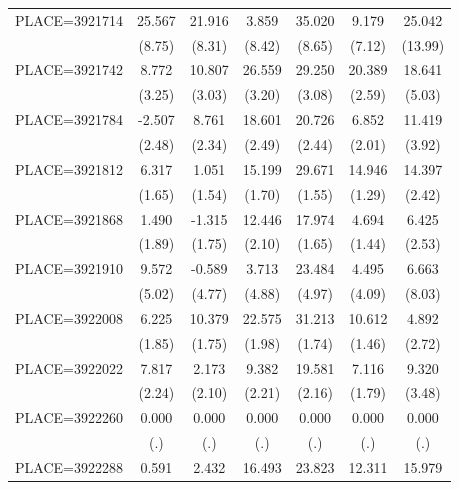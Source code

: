 {\begin{tabular}{l*{6}{c}}
PLACE=3921714       &      25.567&      21.916&       3.859&      35.020&       9.179&      25.042\\
                    &      (8.75)&      (8.31)&      (8.42)&      (8.65)&      (7.12)&     (13.99)\\
PLACE=3921742       &       8.772&      10.807&      26.559&      29.250&      20.389&      18.641\\
                    &      (3.25)&      (3.03)&      (3.20)&      (3.08)&      (2.59)&      (5.03)\\
PLACE=3921784       &      -2.507&       8.761&      18.601&      20.726&       6.852&      11.419\\
                    &      (2.48)&      (2.34)&      (2.49)&      (2.44)&      (2.01)&      (3.92)\\
PLACE=3921812       &       6.317&       1.051&      15.199&      29.671&      14.946&      14.397\\
                    &      (1.65)&      (1.54)&      (1.70)&      (1.55)&      (1.29)&      (2.42)\\
PLACE=3921868       &       1.490&      -1.315&      12.446&      17.974&       4.694&       6.425\\
                    &      (1.89)&      (1.75)&      (2.10)&      (1.65)&      (1.44)&      (2.53)\\
PLACE=3921910       &       9.572&      -0.589&       3.713&      23.484&       4.495&       6.663\\
                    &      (5.02)&      (4.77)&      (4.88)&      (4.97)&      (4.09)&      (8.03)\\
PLACE=3922008       &       6.225&      10.379&      22.575&      31.213&      10.612&       4.892\\
                    &      (1.85)&      (1.75)&      (1.98)&      (1.74)&      (1.46)&      (2.72)\\
PLACE=3922022       &       7.817&       2.173&       9.382&      19.581&       7.116&       9.320\\
                    &      (2.24)&      (2.10)&      (2.21)&      (2.16)&      (1.79)&      (3.48)\\
PLACE=3922260       &       0.000&       0.000&       0.000&       0.000&       0.000&       0.000\\
                    &         (.)&         (.)&         (.)&         (.)&         (.)&         (.)\\
PLACE=3922288       &       0.591&       2.432&      16.493&      23.823&      12.311&      15.979\\

\end{tabular}}
